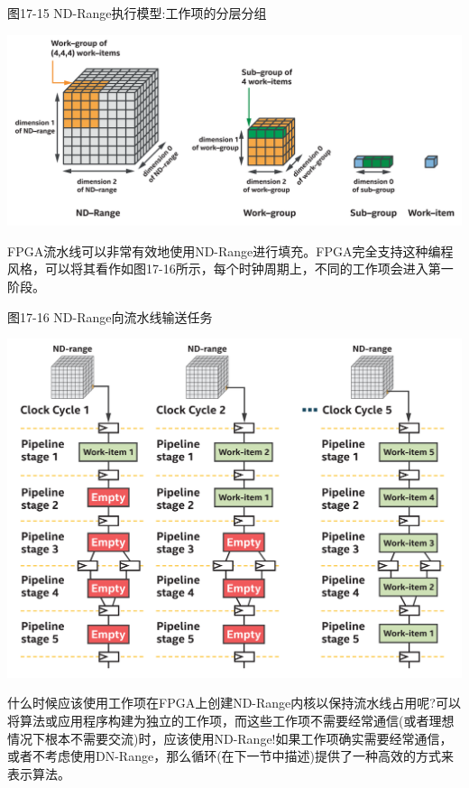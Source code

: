 \hspace*{\fill} \par %
图17-15 ND-Range执行模型:工作项的分层分组
\begin{center}
	\includegraphics[width=1.0\textwidth]{content/chapter-17/images/14}
\end{center}

FPGA流水线可以非常有效地使用ND-Range进行填充。FPGA完全支持这种编程风格，可以将其看作如图17-16所示，每个时钟周期上，不同的工作项会进入第一阶段。\par

\hspace*{\fill} \par %
图17-16 ND-Range向流水线输送任务
\begin{center}
	\includegraphics[width=1.0\textwidth]{content/chapter-17/images/15}
\end{center}

什么时候应该使用工作项在FPGA上创建ND-Range内核以保持流水线占用呢?可以将算法或应用程序构建为独立的工作项，而这些工作项不需要经常通信(或者理想情况下根本不需要交流)时，应该使用ND-Range!如果工作项确实需要经常通信，或者不考虑使用DN-Range，那么循环(在下一节中描述)提供了一种高效的方式来表示算法。\par


